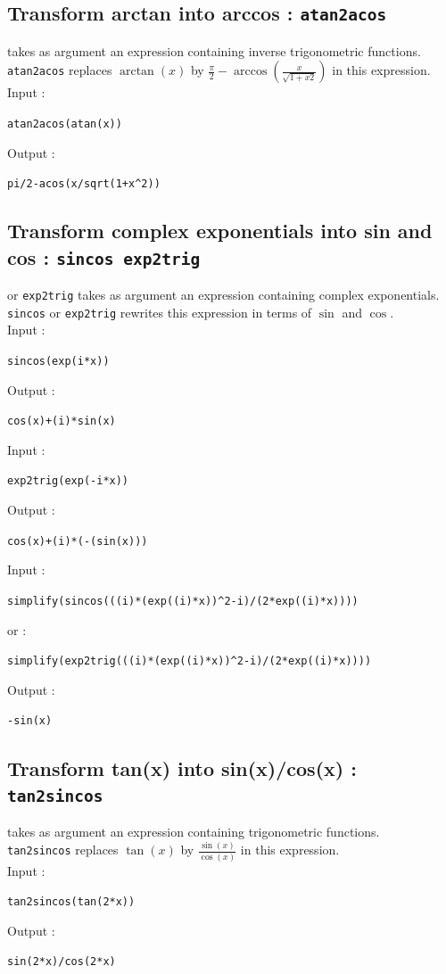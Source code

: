 \documentclass[a4paper,11pt]{book}
\begin{document}
\subsection{Transform arctan into arccos : {\tt atan2acos}}
 takes as argument an expression containing 
inverse trigonometric functions.\\
{\tt atan2acos} replaces $\arctan(x)$ by 
$\displaystyle \frac{\pi}{2}-\arccos(\frac{x}{\sqrt{1+x2}})$ 
in this expression.\\
Input :
\begin{center}{\tt atan2acos(atan(x))}\end{center}
Output :
\begin{center}{\tt pi/2-acos(x/sqrt(1+x\verb|^|2))}\end{center}

\subsection{Transform complex exponentials into sin and cos : {\tt sincos exp2trig}}
  or {\tt exp2trig} takes as argument an expression 
containing complex exponentials.\\
{\tt sincos} or {\tt exp2trig} rewrites this expression in terms of  
$\sin$ and  $\cos$.\\
Input :
\begin{center}{\tt sincos(exp(i*x))}\end{center}
Output :
\begin{center}{\tt cos(x)+(i)*sin(x)}\end{center}
Input :
\begin{center}{\tt exp2trig(exp(-i*x))}\end{center}
Output :
\begin{center}{\tt cos(x)+(i)*(-(sin(x)))}\end{center}
Input :
\begin{center}{\tt simplify(sincos(((i)*(exp((i)*x))\verb|^|2-i)/(2*exp((i)*x))))}\end{center}
or :
\begin{center}{\tt simplify(exp2trig(((i)*(exp((i)*x))\verb|^|2-i)/(2*exp((i)*x))))}\end{center}
Output :
\begin{center}{\tt -sin(x)}\end{center}

\subsection{Transform tan(x) into sin(x)/cos(x) : {\tt tan2sincos}}
 takes as argument an expression containing 
trigonometric functions.\\
{\tt tan2sincos} replaces $\tan(x)$ by
 $\displaystyle \frac{\sin(x)}{\cos(x)}$ in this expression.\\
Input :
\begin{center}{\tt tan2sincos(tan(2*x))}\end{center}
Output :
\begin{center}{\tt sin(2*x)/cos(2*x)}\end{center}
\end{document}
